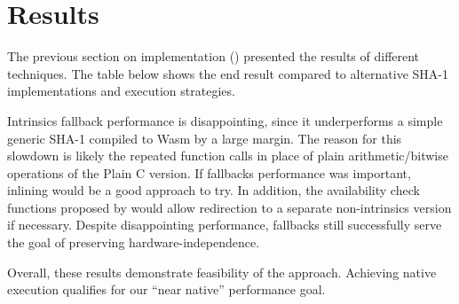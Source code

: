 \section{Results}
\label{sec:results}

The previous section on implementation () presented the
results of different techniques. The table below shows the end result compared
to alternative SHA-1 implementations and execution strategies.

\begin{center}

\end{center}

Intrinsics fallback performance is disappointing, since it underperforms a
simple generic SHA-1 compiled to Wasm by a large margin.
%
The reason for this slowdown is likely the repeated \wasm function calls in
place of plain arithmetic/bitwise operations of the Plain C version. If
fallbacks performance was important, inlining would be a good approach to try.
%
In addition, the availability check functions proposed by
 would allow redirection to a separate non-intrinsics
version if necessary.
%
Despite disappointing performance, fallbacks still successfully serve the goal
of preserving \wasm hardware-independence.

Overall, these results demonstrate feasibility of the approach. Achieving
\MetricInlineWasmtimeHwwasmDivNative native execution qualifies for our ``near
native'' performance goal.
